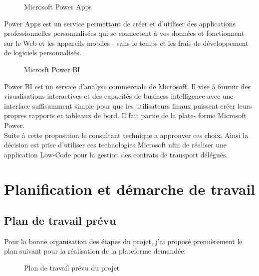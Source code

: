 \documentclass[a4paper]{report}
\begin{document}
\begin{doublespace}
\begin{figure}[H]
\begin{center}
			\caption{Microsoft Power Apps}
		\end{center}
	\end{figure}
	Power Apps est un service permettant de créer
	et d'utiliser des applications professionnelles
	personnalisées qui se connectent à vos
	données et fonctionnent sur le Web et les
	appareils mobiles - sans le temps et les frais
	de développement de logiciels personnalisés.
	\begin{figure}[H]
		\begin{center}
			\caption{Microsft Power BI}
		\end{center}
	\end{figure}
	Power BI est un service d'analyse
	commerciale de Microsoft. Il vise à fournir des
	visualisations interactives et des capacités de
	business intelligence avec une interface
	suffisamment simple pour que les utilisateurs
	finaux puissent créer leurs propres rapports et
	tableaux de bord. Il fait partie de la plate-
	forme Microsoft Power.\\
	Suite à cette proposition le consultant technique a approuver ces choix. Ainsi la décision est prise d'utiliser ces technologies Microsoft afin de réaliser une application Low-Code pour la gestion des contrats de transport délégués.
	\section{Planification et démarche de travail}
	\subsection{Plan de travail prévu}
	Pour la bonne organisation des étapes du projet, j'ai proposé premièrement le plan suivant pour la réalisation de la plateforme demandée:
	\begin{figure}[H]
		\begin{center}
			\caption{Plan de travail prévu du projet}
		\end{center}
	\end{figure}

\end{doublespace}
\end{document}
